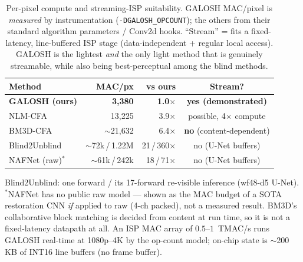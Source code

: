 \begin{table}[t]
\centering
\caption{Per-pixel compute and streaming-ISP suitability. GALOSH MAC/pixel is
\emph{measured} by instrumentation (\texttt{-DGALOSH\_OPCOUNT}); the others from
their standard algorithm parameters / Conv2d hooks. ``Stream'' = fits a
fixed-latency, line-buffered ISP stage (data-independent + regular local access).
GALOSH is the lightest \emph{and} the only light method that is genuinely
streamable, while also being best-perceptual among the blind methods.}
\label{tab:isp}
\setlength{\tabcolsep}{4pt}
\begin{tabular}{l r r c}
\toprule
Method & MAC/px & vs ours & Stream? \\
\midrule
\textbf{GALOSH (ours)} & \textbf{3{,}380} & \textbf{1.0$\times$} & \textbf{yes (demonstrated)} \\
NLM-CFA            & 13{,}225 & 3.9$\times$ & possible, 4$\times$ compute \\
BM3D-CFA           & $\sim$21{,}632 & 6.4$\times$ & \textbf{no} (content-dependent) \\
Blind2Unblind      & $\sim$72k\,/\,1.22M & 21\,/\,360$\times$ & no (U-Net buffers) \\
NAFNet (raw)$^{*}$ & $\sim$61k\,/\,242k & 18\,/\,71$\times$ & no (U-Net buffers) \\
\bottomrule
\end{tabular}

\vspace{2pt}
{\footnotesize Blind2Unblind: one forward / its 17-forward re-visible inference
(wf48-d5 U-Net). $^{*}$NAFNet has no public raw model --- shown as the MAC budget
of a SOTA restoration CNN \emph{if} applied to raw (4-ch packed), not a measured
result. BM3D's collaborative block matching is decided from content at run time,
so it is not a fixed-latency datapath at all. An ISP MAC array of
$0.5$--$1$~TMAC/s runs GALOSH real-time at 1080p--4K by the op-count model;
on-chip state is $\sim$200\,KB of INT16 line buffers (no frame buffer).}
\end{table}
